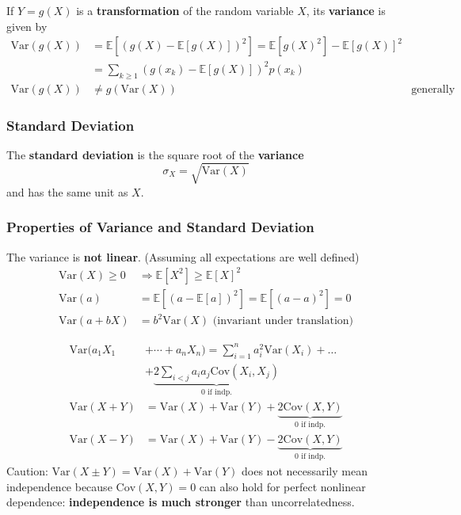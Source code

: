 \newpar{}
If $Y=g(X)$ is a \textbf{transformation} of the random variable $X$, its \textbf{variance} is given by
\noindent\begin{align*}
    \mathrm{Var}(g(X)) & =\mathbb{E}[{(g(X)-\mathbb{E}[g(X)])}^{2}]   = \mathbb{E}[{g(X)}^2]-{\mathbb{E}[g(X)]}^2 \\      %
                       & =\sum_{k\geq1}{(g(x_{k})-\mathbb{E}[g(X)])}^{2}p(x_{k})                    \\
    \mathrm{Var}(g(X)) & \neq g(\mathrm{Var}(X))                                 & \text{generally}
\end{align*}

\subsubsection{Standard Deviation}
The \textbf{standard deviation} is the square root of the \textbf{variance}
\noindent\begin{equation*}
    \sigma_{X}=\sqrt{\mathrm{Var}(X)}
\end{equation*}
and has the same unit as $X$.

\subsubsection{Properties of Variance and Standard Deviation}

The variance is \textbf{not linear}. (Assuming all expectations are well defined)
\noindent\begin{align*}
    \mathrm{Var}(X)\geq0 & \Rightarrow\mathbb{E}[X^{2}]\geq{\mathbb{E}[X]}^{2}                    \\
    \mathrm{Var}(a)      & =\mathbb{E}[{(a-\mathbb{E}[a])}^2]=\mathbb{E}[{(a-a)}^2]=0             \\
    \mathrm{Var}(a+bX)   & = b^2\mathrm{Var}(X)\text{ (invariant under translation)}
\end{align*}

\noindent\begin{align*}
    \mathrm{Var}(a_1X_1 & +\cdots+a_n X_n)  =\sum_{i=1}^{n}a_{i}^{2}\mathrm{Var}(X_{i})+\ldots                  \\
                        & + \underbrace{2\sum_{i<j}a_{i}a_{j}\mathrm{Cov}(X_{i},X_{j})}_{0\text{ if indp.}}     \\
    \mathrm{Var}(X+Y)   & =\mathrm{Var}(X)+\mathrm{Var}(Y)+ \underbrace{2\mathrm{Cov}(X,Y)}_{0\text{ if indp.}} \\
    \mathrm{Var}(X-Y)   & =\mathrm{Var}(X)+\mathrm{Var}(Y)-\underbrace{2\mathrm{Cov}(X,Y)}_{0\text{ if indp.}}
\end{align*}
Caution: $\mathrm{Var}(X\pm Y) = \mathrm{Var}(X)+\mathrm{Var}(Y)$ does not necessarily mean independence because $\mathrm{Cov}(X,Y)=0$ can also hold for perfect nonlinear dependence: \textbf{independence is much stronger} than uncorrelatedness.

